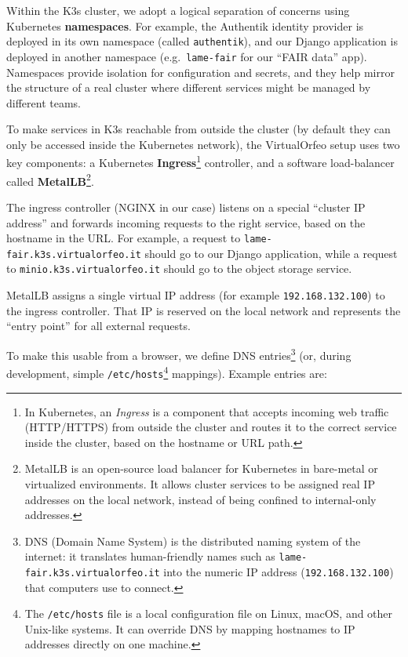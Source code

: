 \medskip

Within the K3s cluster, we adopt a logical separation of concerns using
Kubernetes \textbf{namespaces}. For example, the Authentik identity provider is
deployed in its own namespace (called \texttt{authentik}), and our Django
application is deployed in another namespace (e.g.\ \texttt{lame-fair} for our
``FAIR data'' app). Namespaces provide isolation for configuration and secrets,
and they help mirror the structure of a real cluster where different services
might be managed by different teams.

\medskip

To make services in K3s reachable from outside the cluster (by default they can only be accessed inside the Kubernetes network), the VirtualOrfeo setup uses two key components: a Kubernetes \textbf{Ingress}\footnote{%
	In Kubernetes, an \emph{Ingress} is a component that accepts incoming web traffic (HTTP/HTTPS) from outside the cluster and routes it to the correct service inside the cluster, based on the hostname or URL path.} controller, and a software load-balancer called \textbf{MetalLB}\footnote{%
	MetalLB is an open-source load balancer for Kubernetes in bare-metal or virtualized environments. It allows cluster services to be assigned real IP addresses on the local network, instead of being confined to internal-only addresses.}.

The ingress controller (NGINX in our case) listens on a special “cluster IP address” and forwards incoming requests to the right service, based on the hostname in the URL. For example, a request to \texttt{lame-fair.k3s.virtualorfeo.it} should go to our Django application, while a request to \texttt{minio.k3s.virtualorfeo.it} should go to the object storage service.

MetalLB assigns a single virtual IP address (for example \texttt{192.168.132.100}) to the ingress controller. That IP is reserved on the local network and represents the “entry point” for all external requests.

To make this usable from a browser, we define DNS entries\footnote{%
	DNS (Domain Name System) is the distributed naming system of the internet: it translates human-friendly names such as \texttt{lame-fair.k3s.virtualorfeo.it} into the numeric IP address (\texttt{192.168.132.100}) that computers use to connect.} (or, during development, simple \texttt{/etc/hosts}\footnote{%
	The \texttt{/etc/hosts} file is a local configuration file on Linux, macOS, and other Unix-like systems. It can override DNS by mapping hostnames to IP addresses directly on one machine.} mappings). Example entries are:

